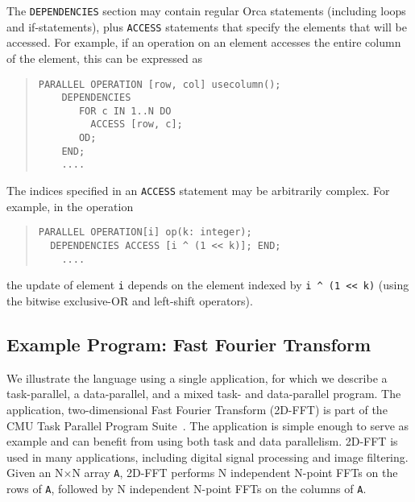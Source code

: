 \documentclass{acmtrans2e}
\begin{document}
The \verb+DEPENDENCIES+ section may contain regular Orca statements
(including loops and if-statements), plus \verb+ACCESS+ statements that
specify the elements that will be accessed.
For example, if an operation on an element accesses the entire column
of the element, this can be expressed as

\begin{quote}
\begin{verbatim}
PARALLEL OPERATION [row, col] usecolumn();
    DEPENDENCIES
       FOR c IN 1..N DO
         ACCESS [row, c];
       OD;
    END;
    ....
\end{verbatim}
\end{quote}

The indices specified in an \verb+ACCESS+ statement may be arbitrarily
complex. For example, in the operation

\begin{quote}
\begin{verbatim}
PARALLEL OPERATION[i] op(k: integer);
  DEPENDENCIES ACCESS [i ^ (1 << k)]; END;
    ....
\end{verbatim}
\end{quote}
the update of element \verb+i+ depends on the
element indexed by \verb+i ^ (1 << k)+
(using the bitwise exclusive-OR and left-shift operators).


\subsection{Example Program: Fast Fourier Transform}
\label{sec:fft}

We illustrate the language using a single application, for
which we describe a task-parallel, a data-parallel, and a mixed
task- and data-parallel program.
The application, two-dimensional Fast Fourier Transform (2D-FFT)
is part of the CMU Task Parallel Program Suite~\cite{dinda94}.
The application is simple enough to serve as example and
can benefit from using both task and data parallelism.
2D-FFT is used in many
applications, including digital signal processing and image filtering.
Given an N$\times$N array \verb+A+, 2D-FFT performs N independent
N-point FFTs on the rows of \verb+A+, followed by N independent N-point
FFTs on the columns of \verb+A+.
\end{document}
